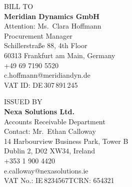 \documentclass[11pt,a4paper]{article}
\newcommand{\labeltext}[1]{\textcolor{TextLight}{\footnotesize\MakeUppercase{#1}}}
\begin{document}
\vspace{12mm}

\noindent
\begin{minipage}[t]{0.47\linewidth}
  \begin{tcolorbox}[infopanel, height=56mm]
    \labeltext{Bill To}\\[5pt]
    {\color{NexaNavy}\bfseries Meridian Dynamics GmbH}\\[2pt]
    \textcolor{TextMid}{\small Attention: Ms.\ Clara Hoffmann}\\
    \textcolor{TextMid}{\small Procurement Manager}\\[3pt]
    \textcolor{TextMid}{\small Schillerstra{\ss}e 88, 4th Floor}\\
    \textcolor{TextMid}{\small 60313 Frankfurt am Main, Germany}\\[3pt]
    \textcolor{TextMid}{\small\faPhone\enspace +49 69 7190 5520}\\
    \textcolor{TextMid}{\small\faEnvelope\enspace c.hoffmann@meridiandyn.de}\\[3pt]
    \textcolor{TextMid}{\small VAT ID: DE\,307\,891\,245}
  \end{tcolorbox}
\end{minipage}%
\hfill
\begin{minipage}[t]{0.47\linewidth}
  \begin{tcolorbox}[infopanel, height=56mm]
    \labeltext{Issued By}\\[5pt]
    {\color{NexaNavy}\bfseries Nexa Solutions Ltd.}\\[2pt]
    \textcolor{TextMid}{\small Accounts Receivable Department}\\
    \textcolor{TextMid}{\small Contact: Mr.\ Ethan Calloway}\\[3pt]
    \textcolor{TextMid}{\small 14 Harbourview Business Park, Tower B}\\
    \textcolor{TextMid}{\small Dublin 2, D02 XW34, Ireland}\\[3pt]
    \textcolor{TextMid}{\small\faPhone\enspace +353 1 900 4420}\\
    \textcolor{TextMid}{\small\faEnvelope\enspace e.calloway@nexasolutions.ie}\\[3pt]
    \textcolor{TextMid}{\small VAT No.: IE\,8234567T\enspace\textbullet\enspace CRN: 654321}
  \end{tcolorbox}
\end{minipage}

\par\vspace{6mm}
\end{document}
